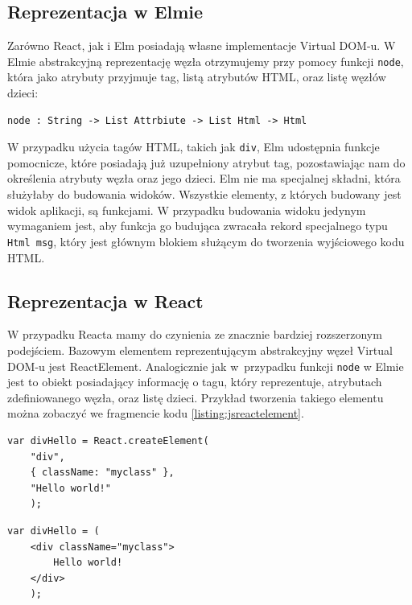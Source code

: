 \subsection{Reprezentacja w Elmie}
Zarówno React, jak i Elm posiadają własne implementacje Virtual DOM-u. W Elmie abstrakcyjną reprezentację węzła otrzymujemy przy pomocy funkcji \lstinline{node}, która jako atrybuty przyjmuje tag, listą atrybutów HTML, oraz listę węzłów dzieci:
\begin{lstlisting}[style=elm-style]
	node : String -> List Attrbiute -> List Html -> Html
\end{lstlisting}
W przypadku użycia tagów HTML, takich jak \lstinline{div}, Elm udostępnia funkcje pomocnicze, które posiadają już uzupełniony atrybut tag, pozostawiając nam do określenia atrybuty węzła oraz jego dzieci. Elm nie ma specjalnej składni, która służyłaby do budowania widoków. Wszystkie elementy, z których budowany jest widok aplikacji, są funkcjami. W przypadku budowania widoku jedynym wymaganiem jest, aby funkcja go budująca zwracała rekord specjalnego typu \lstinline[style=elm-style]{Html msg}, który jest głównym blokiem służącym do tworzenia wyjściowego kodu HTML.

\subsection{Reprezentacja w React}
W przypadku Reacta mamy do czynienia ze znacznie bardziej rozszerzonym podejściem.  Bazowym elementem reprezentującym abstrakcyjny węzeł Virtual DOM-u jest ReactElement. Analogicznie jak w~przypadku funkcji \lstinline{node} w Elmie jest to obiekt posiadający informację o tagu, który reprezentuje, atrybutach zdefiniowanego węzła, oraz listę dzieci. Przykład tworzenia takiego elementu można zobaczyć we fragmencie kodu \ref{listing:jsreactelement}. 

\begin{minipage}{.45\textwidth}
	\begin{lstlisting}[caption=Javascript,style=JavaScript,label = listing:jsreactelement]
	var divHello = React.createElement(
	"div",
	{ className: "myclass" },
	"Hello world!"
	);
	\end{lstlisting}
\end{minipage}\hfill
\begin{minipage}{.45\textwidth}
	\begin{lstlisting}[caption=JSX,style=JavaScript,firstnumber=1,label = listing:jsx]
	var divHello = (
	<div className="myclass">
		Hello world!
	</div>
	);
	\end{lstlisting}
\end{minipage}

